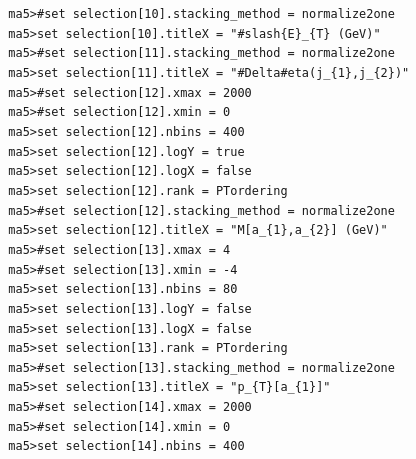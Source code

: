 \documentclass[a4paper, 10pt]{article}
\begin{document}
\texttt{ }\texttt{ }\texttt{ma5>\#set selection[10].stacking\_method = normalize2one\\
}
\texttt{ }\texttt{ }\texttt{ma5>set selection[10].titleX = "\#slash\{E\}\_\{T\} (GeV)"\\
}
\texttt{ }\texttt{ }\texttt{ma5>\#set selection[11].stacking\_method = normalize2one\\
}
\texttt{ }\texttt{ }\texttt{ma5>set selection[11].titleX = "\#Delta\#eta(j\_\{1\},j\_\{2\})"\\
}
\texttt{ }\texttt{ }\texttt{ma5>\#set selection[12].xmax = 2000\\
}
\texttt{ }\texttt{ }\texttt{ma5>\#set selection[12].xmin = 0\\
}
\texttt{ }\texttt{ }\texttt{ma5>set selection[12].nbins = 400\\
}
\texttt{ }\texttt{ }\texttt{ma5>set selection[12].logY = true\\
}
\texttt{ }\texttt{ }\texttt{ma5>set selection[12].logX = false\\
}
\texttt{ }\texttt{ }\texttt{ma5>set selection[12].rank = PTordering\\
}
\texttt{ }\texttt{ }\texttt{ma5>\#set selection[12].stacking\_method = normalize2one\\
}
\texttt{ }\texttt{ }\texttt{ma5>set selection[12].titleX = "M[a\_\{1\},a\_\{2\}] (GeV)"\\
}
\texttt{ }\texttt{ }\texttt{ma5>\#set selection[13].xmax = 4\\
}
\texttt{ }\texttt{ }\texttt{ma5>\#set selection[13].xmin = -4\\
}
\texttt{ }\texttt{ }\texttt{ma5>set selection[13].nbins = 80\\
}
\texttt{ }\texttt{ }\texttt{ma5>set selection[13].logY = false\\
}
\texttt{ }\texttt{ }\texttt{ma5>set selection[13].logX = false\\
}
\texttt{ }\texttt{ }\texttt{ma5>set selection[13].rank = PTordering\\
}
\texttt{ }\texttt{ }\texttt{ma5>\#set selection[13].stacking\_method = normalize2one\\
}
\texttt{ }\texttt{ }\texttt{ma5>set selection[13].titleX = "p\_\{T\}[a\_\{1\}]"\\
}
\texttt{ }\texttt{ }\texttt{ma5>\#set selection[14].xmax = 2000\\
}
\texttt{ }\texttt{ }\texttt{ma5>\#set selection[14].xmin = 0\\
}
\texttt{ }\texttt{ }\texttt{ma5>set selection[14].nbins = 400\\
}
\end{document}
